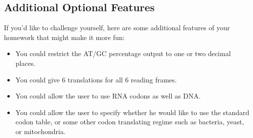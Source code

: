 \documentclass[11pt]{amsart}
\begin{document}
\subsection*{Additional Optional Features}
If you'd like to challenge yourself, here are some additional features of your homework that might make it more fun:
\begin{itemize}
	\item You could restrict the AT/GC percentage output to one or two decimal places.
	\item You could give 6 translations for all 6 reading frames.
	\item You could allow the user to use RNA codons as well as DNA.
	\item You could allow the user to specify whether he would like to use the standard codon table, or some other codon translating regime such as bacteria, yeast, or mitochondria.
\end{itemize}
\end{document}
